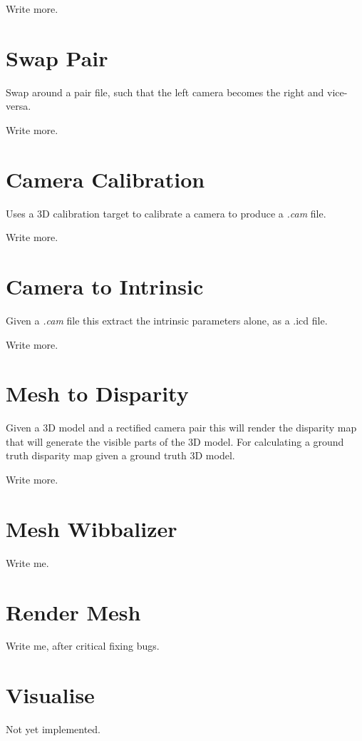 \documentclass[10pt,a4paper,twoside]{article}
\begin{document}
Write more.



\section{Swap Pair}
Swap around a pair file, such that the left camera becomes the right and vice-versa.

Write more.



\section{Camera Calibration}
Uses a 3D calibration target to calibrate a camera to produce a \emph{.cam} file.

Write more.



\section{Camera to Intrinsic}
Given a \emph{.cam} file this extract the intrinsic parameters alone, as a {.icd} file.

Write more.



\section{Mesh to Disparity}
Given a 3D model and a rectified camera pair this will render the disparity map that will generate the visible parts of the 3D model. For calculating a ground truth disparity map given a ground truth 3D model.

Write more.



\section{Mesh Wibbalizer}
Write me.



\section{Render Mesh}
Write me, after critical fixing bugs.



\section{Visualise}
Not yet implemented.
\end{document}
